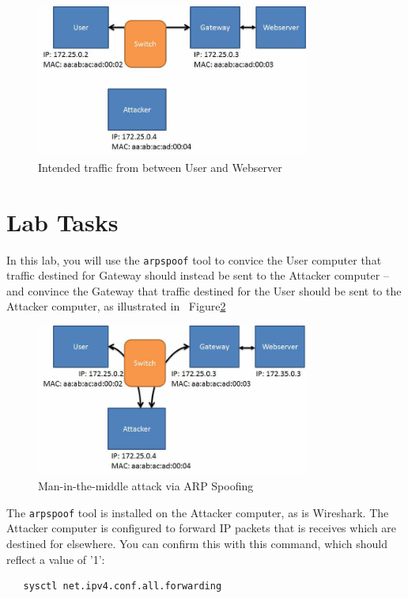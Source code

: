\begin{figure}[htb]
\begin{center}
\includegraphics [width=0.8\textwidth,natwidth=621,natheight=403]{figure1.jpg}
\end{center}
\caption{Intended traffic from between User and Webserver}
\label{fig:intended}
\end{figure}

\section{Lab Tasks}
In this lab, you will use the {\tt arpspoof} tool to convice the User computer that
traffic destined for Gateway should instead be sent to the Attacker computer -- and
convince the Gateway that traffic destined for the User should be sent to the Attacker
computer, as illustrated in ~Figure\ref{fig:spoofed}
\begin{figure}[H]
\begin{center}
\includegraphics [width=0.8\textwidth,natwidth=621,natheight=403]{figure2.jpg}
\end{center}
\caption{Man-in-the-middle attack via ARP Spoofing}
\label{fig:spoofed}
\end{figure}

The {\tt arpspoof} tool is installed on the Attacker computer, as is Wireshark.
The Attacker computer is configured to forward IP packets that is receives which
are destined for elsewhere.  You can confirm this with this command, which should
reflect a value of '1':
\begin{verbatim}
   sysctl net.ipv4.conf.all.forwarding
\end{verbatim}

